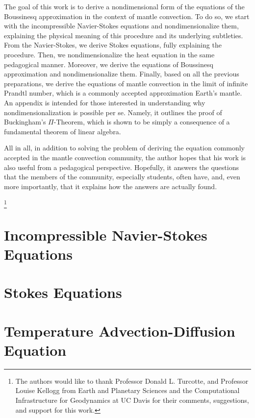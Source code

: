\documentclass[oneside]{amsbook}
\theoremstyle{definition}
\theoremstyle{remark}
\numberwithin{section}{chapter}
\numberwithin{equation}{chapter}
\begin{document}
The goal of this work is to derive a nondimensional form of the equations of the Boussinesq approximation in the context of mantle convection. To do so, we start with the incompressible Navier-Stokes equations and nondimensionalize them, explaining the physical meaning of this procedure and its underlying subtleties. From the Navier-Stokes, we derive Stokes equations, fully explaining the procedure. Then, we nondimensionalize the heat equation in the same pedagogical manner. Moreover, we derive the equations of Boussinesq approximation and nondimensionalize them. Finally, based on all the previous preparations, we derive the equations of mantle convection in the limit of infinite Prandtl number, which is a commonly accepted approximation Earth's mantle. An appendix is intended for those interested in understanding why nondimensionalization is possible per se. Namely, it outlines the proof of Buckingham's $\Pi$-Theorem, which is shown to be simply a consequence of a fundamental theorem of linear algebra. 

All in all, in addition to solving the problem of deriving the equation commonly accepted in the mantle convection community, the author hopes that his work is also useful from a pedagogical perspective. Hopefully, it answers the questions that the members of the community, especially students, often have, and, even more importantly, that it explains how the answers are actually found.

\thanks{The authors would like to thank Professor Donald L. Turcotte, and Professor Louise Kellogg from Earth and Planetary Sciences and the Computational Infrastructure for Geodynamics at UC Davis for their comments, suggestions, and support for this work.}

\chapter{Incompressible Navier-Stokes Equations} \label{navier_stokes}


\chapter{Stokes Equations} \label{stokes}


\chapter{Temperature Advection-Diffusion Equation} \label{heat}

\end{document}
